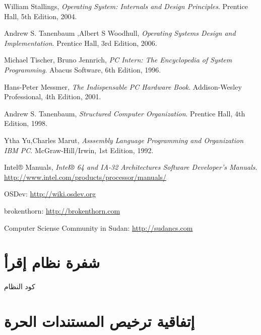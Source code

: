 \documentclass[document.tex]{subfiles}
\begin{document}
\begin{english}
\begin{thebibliography}{10}
 
  William Stallings,
  \emph{Operating System: Internals and Design Principles}.
  Prentice Hall,
  5th Edition,
  2004.
 
  Andrew S. Tanenbaum ,Albert S Woodhull,
  \emph{Operating Systems Design and Implementation}.
  Prentice Hall,
  3rd Edition,
   2006.

  Michael Tischer, Bruno Jennrich,
  \emph{PC Intern: The Encyclopedia of System Programming}.
  Abacus Software,
  6th Edition,
  1996.

  Hans-Peter Messmer,
  \emph{The Indispensable PC Hardware Book}.
  Addison-Wesley Professional,
  4th Edition,
  2001.

  Andrew S. Tanenbaum,
  \emph{Structured Computer Organization}.
  Prentice Hall,
  4th Edition,
  1998.

  Ytha Yu,Charles Marut,
  \emph{Asssembly Language Programming and Organization IBM PC}.
  McGraw-Hill/Irwin,
  1st Edition,
  1992.

  Intel® Manuals,
  \emph{Intel® 64 and IA-32 Architectures Software Developer's Manuals}.
  \url{http://www.intel.com/products/processor/manuals/}


   OSDev:
   \url{http://wiki.osdev.org}

  brokenthorn:
  \url{http://brokenthorn.com}

  Computer Sciense Community in Sudan:
  \url{http://sudancs.com}

\end{thebibliography}
\end{english}

\chapter{شفرة نظام إقرأ}
كود النظام

\chapter{إتفاقية ترخيص المستندات الحرة }
\begin{english}
%
\end{english}
\end{document}

